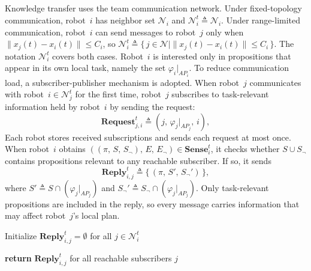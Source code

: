 \subsection{}
\label{ch03:subsec:know-transfer}

Knowledge transfer uses the team communication network. Under fixed-topology
communication, robot~$i$ has neighbor set $\mathcal{N}_i$ and
$\mathcal{N}_i^t \triangleq \mathcal{N}_i$. Under range-limited communication,
robot~$i$ can send messages to robot~$j$ only when
$\|x_j(t) - x_i(t)\| \leq C_i$, so
$\mathcal{N}_i^t \triangleq
\{\, j \in \mathcal{N} \mid \|x_j(t) - x_i(t)\| \leq C_i \,\}$. The notation
$\mathcal{N}_i^t$ covers both cases.
Robot~$i$ is interested only in propositions that appear in its own local task,
namely the set $\varphi_i|_{AP_i}$. To reduce communication load, a
subscriber-publisher mechanism is adopted. When robot~$j$ communicates with
robot~$i \in \mathcal{N}_j^t$ for the first time, robot~$j$ subscribes to
task-relevant information held by robot~$i$ by sending the request:
\begin{equation}
\textbf{Request}_{j,i}^t \triangleq
(j,\, \varphi_j|_{AP_j},\, i),
\label{ch03:eq:robot-request}
\end{equation}
 Each robot stores received subscriptions and sends each request at
most once. When robot~$i$ obtains
$((\pi,\, S,\, S_{\neg}),\, E,\, E_{\neg}) \in \textbf{Sense}_i^t$, it checks
whether $S \cup S_{\neg}$ contains propositions relevant to any reachable
subscriber. If so, it sends
\begin{equation}
\textbf{Reply}_{i,j}^t \triangleq
\{\, (\pi,\, S',\, S_{\neg}') \,\},
\label{ch03:eq:robot-reply}
\end{equation}
where
$S' \triangleq S \cap (\varphi_j|_{AP_j})$ and
$S_{\neg}' \triangleq S_{\neg} \cap (\varphi_j|_{AP_j})$.
Only task-relevant propositions are included in the reply, so every
message carries information that may affect robot~$j$'s local plan.

\begin{algorithm}[t]
\caption{Transfer knowledge to subscribed robots, \texttt{TranKnow}()}
\label{ch03:alg:transferAlgo}
\DontPrintSemicolon
{}

Initialize $\textbf{Reply}_{i,j}^t = \emptyset$ for all $j \in \mathcal{N}_i^t$\;

\textbf{return} $\textbf{Reply}_{i,j}^t$ for all reachable subscribers $j$\;
\end{algorithm}

